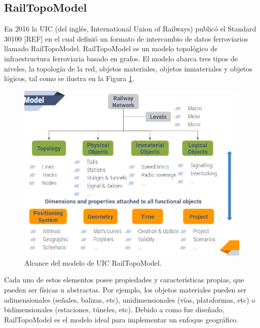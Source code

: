 \subsection{RailTopoModel}

    En 2016 la UIC (del inglés, International Union of Railways) publicó el Standard 30100 [REF] en el cual definió un formato de intercambio de datos ferroviarios llamado RailTopoModel. RailTopoModel es un modelo topológico de infraestructura ferroviaria basado en grafos. El modelo abarca tres tipos de niveles, la topología de la red, objetos materiales, objetos inmateriales y objetos lógicos, tal como se ilustra en la Figura \ref{fig:RTM_3}. 

    \begin{figure}[!h]
        \centering
        \includegraphics[width=1\textwidth]{Figuras/objetos}
        \centering\caption{Alcance del modelo de UIC RailTopoModel.}
        \label{fig:RTM_3}
    \end{figure}

    Cada uno de estos elementos posee propiedades y características propias, que pueden ser físicas u abstractas. Por ejemplo, los objetos materiales pueden ser adimensionales (señales, balizas, etc), unidimensionales (vías, plataformas, etc) o bidimensionales (estaciones, túneles, etc). Debido a como fue diseñado, RailTopoModel es el modelo ideal para implementar un enfoque geográfico.
    




